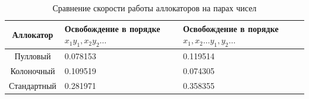 \begin{table}[H]
	\begin{tabular}{|c|p{6.5cm}|p{6.5cm}|}
	\hline Аллокатор & Освобождение в порядке $x_1 y_1, x_2 y_2 \ldots$ & Освобождение в порядке $x_1, x_2\ldots y_1, y_2\ldots$ \\
	\hline Пулловый & 0.078153 & 0.119514 \\
	\hline Колоночный & 0.109519 & 0.074305 \\
	\hline Стандартный & 0.281971 & 0.358355 \\
	\hline
\end{tabular}
\caption{Сравнение скорости работы аллокаторов на парах чисел}
\label{tab:pair_results}
\end{table}
